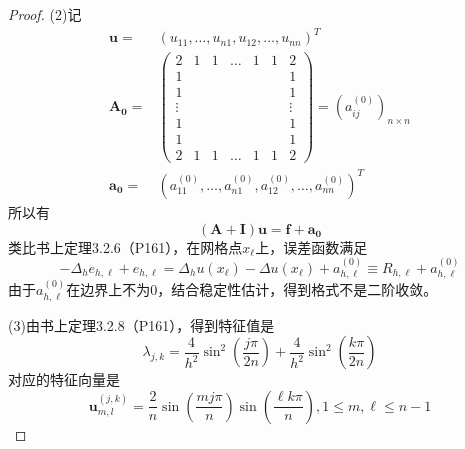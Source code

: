 \documentclass{article}%
\begin{document}
\begin{proof}
(2)记
\begin{align*}
	\mathbf{u}=&\left ( u_{11},\dots,u_{n1},u_{12},\dots,u_{nn} \right )^T  \\
	\mathbf{A_0}=&\begin{pmatrix}
2 & 1 & 1 & \dots & 1 & 1 & 2\\
1 &  &  &  &  &  & 1\\
1 &  &  &  &  &  & 1\\
 \vdots &  &  &  &  &  &  \vdots \\
1 &  &  &  &  &  & 1\\
1 &  &  &  &  &  & 1\\
2 & 1 & 1 & \dots & 1 & 1 & 2
\end{pmatrix}=\left ( a^{(0)}_{ij} \right )_{n\times n}\\
\mathbf{a_0}=&\left ( a^{(0)}_{11},\dots,a^{(0)}_{n1},a^{(0)}_{12},\dots,a^{(0)}_{nn} \right )^T
\end{align*}
所以有$$ \left (\mathbf{A}+\mathbf{I}  \right )\mathbf{u}=\mathbf{f}+\mathbf{a_0} $$
类比书上定理3.2.6（P161），在网格点$x_{\ell}$上，误差函数满足$$-\Delta _he_{h,\ell}+e_{h,\ell}=\Delta _hu(x_{\ell})-\Delta u(x_{\ell})+a^{(0)}_{h,\ell} \equiv R_{h,\ell}+a^{(0)}_{h,\ell}$$
由于$ a^{(0)}_{h,\ell} $在边界上不为0，结合稳定性估计，得到格式不是二阶收敛。

(3)由书上定理3.2.8（P161），得到特征值是$$ \lambda _{j,k}=\frac{4}{h^2}\sin^2(\frac{j\pi}{2n})+\frac{4}{h^2}\sin^2(\frac{k\pi}{2n}) $$
对应的特征向量是$$ \mathbf{u}^{(j,k)}_{m,l}=\frac{2}{n}\sin \left (\frac{mj\pi}{n} \right )\sin \left (\frac{\ell k\pi}{n}\right ),1 \leq m,\ell \leq n-1 $$
\end{proof}
\end{document}
